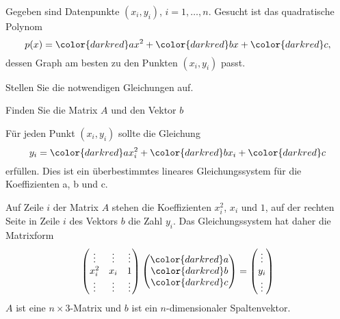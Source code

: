 Gegeben sind Datenpunkte $(x_i,y_i)$, $i=1,\dots,n$.
Gesucht ist das quadratische Polynom
\[
p(x)
=
{\color{darkred}a}x^2
+
{\color{darkred}b}x
+
{\color{darkred}c},
\]
dessen Graph am besten zu den Punkten $(x_i,y_i)$ passt.
\begin{teilaufgaben}
\item
Stellen Sie die notwendigen Gleichungen auf.
\item
Finden Sie die Matrix $A$  und den Vektor $b$
\end{teilaufgaben}

\begin{loesung}
\begin{teilaufgaben}
\item
Für jeden Punkt $(x_i,y_i)$ sollte die Gleichung
\[
y_i
=
{\color{darkred}a}x_i^2
+
{\color{darkred}b}x_i
+
{\color{darkred}c}
\]
erfüllen.
Dies ist ein überbestimmtes lineares Gleichungssystem für die 
Koeffizienten 
{\color{darkred}a},
{\color{darkred}b} und
{\color{darkred}c}.
\item
Auf Zeile $i$ der Matrix $A$ stehen die Koeffizienten $x_i^2$, 
$x_i$ und $1$, auf der rechten Seite in Zeile $i$ des Vektors $b$
die Zahl $y_i$.
Das Gleichungssystem hat daher die Matrixform
\[
\begin{pmatrix}
\vdots&\vdots&\vdots\\
x_i^2 &x_i   &1     \\
\vdots&\vdots&\vdots
\end{pmatrix}
\begin{pmatrix}
\color{darkred}a\\
\color{darkred}b\\
\color{darkred}c
\end{pmatrix}
=
\begin{pmatrix}
\vdots\\
y_i\\
\vdots
\end{pmatrix}
\]
$A$ ist eine $n\times 3$-Matrix und $b$ ist ein $n$-dimensionaler
Spaltenvektor.
\qedhere
\end{teilaufgaben}
\end{loesung}

